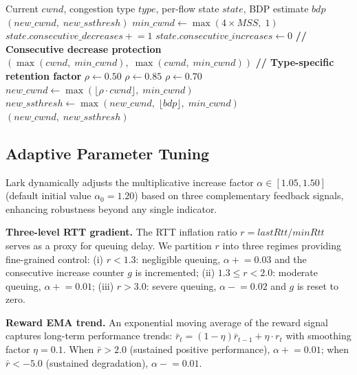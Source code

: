 \documentclass[10pt,twocolumn]{article}
\begin{document}
\begin{algorithm}[htbp]
\caption{Differentiated Congestion Response}
\label{alg:response}
\small
\begin{algorithmic}[1]
\REQUIRE Current $cwnd$, congestion type $type$, per-flow state $state$, BDP estimate $bdp$
\ENSURE $(new\_cwnd, \; new\_ssthresh)$
\STATE $min\_cwnd \leftarrow \max(4 \times MSS, \; 1)$
\STATE $state.consecutive\_decreases \mathrel{+}= 1$
\STATE $state.consecutive\_increases \leftarrow 0$
\STATE \textbf{// Consecutive decrease protection}
    \RETURN $(\max(cwnd, \; min\_cwnd), \; \max(cwnd, \; min\_cwnd))$
\ENDIF
\STATE \textbf{// Type-specific retention factor}
    \STATE $\rho \leftarrow 0.50$
    \STATE $\rho \leftarrow 0.85$
\ELSE
    \STATE $\rho \leftarrow 0.70$ 
\ENDIF
\STATE $new\_cwnd \leftarrow \max(\lfloor \rho \cdot cwnd \rfloor, \; min\_cwnd)$
\STATE $new\_ssthresh \leftarrow \max(new\_cwnd, \; \lfloor bdp \rfloor, \; min\_cwnd)$
\RETURN $(new\_cwnd, \; new\_ssthresh)$
\end{algorithmic}
\end{algorithm}

\subsection{Adaptive Parameter Tuning}

Lark dynamically adjusts the multiplicative increase factor $\alpha \in [1.05, 1.50]$ (default initial value $\alpha_0 = 1.20$) based on three complementary feedback signals, enhancing robustness beyond any single indicator.

\textbf{Three-level RTT gradient.} The RTT inflation ratio $r = lastRtt / minRtt$ serves as a proxy for queuing delay. We partition $r$ into three regimes providing fine-grained control: (i) $r < 1.3$: negligible queuing, $\alpha \mathrel{+}= 0.03$ and the consecutive increase counter $g$ is incremented; (ii) $1.3 \leq r < 2.0$: moderate queuing, $\alpha \mathrel{+}= 0.01$; (iii) $r > 3.0$: severe queuing, $\alpha \mathrel{-}= 0.02$ and $g$ is reset to zero.

\textbf{Reward EMA trend.} An exponential moving average of the reward signal captures long-term performance trends: $\bar{r}_t = (1 - \eta)\bar{r}_{t-1} + \eta \cdot r_t$ with smoothing factor $\eta = 0.1$. When $\bar{r} > 2.0$ (sustained positive performance), $\alpha \mathrel{+}= 0.01$; when $\bar{r} < -5.0$ (sustained degradation), $\alpha \mathrel{-}= 0.01$.
\end{document}
